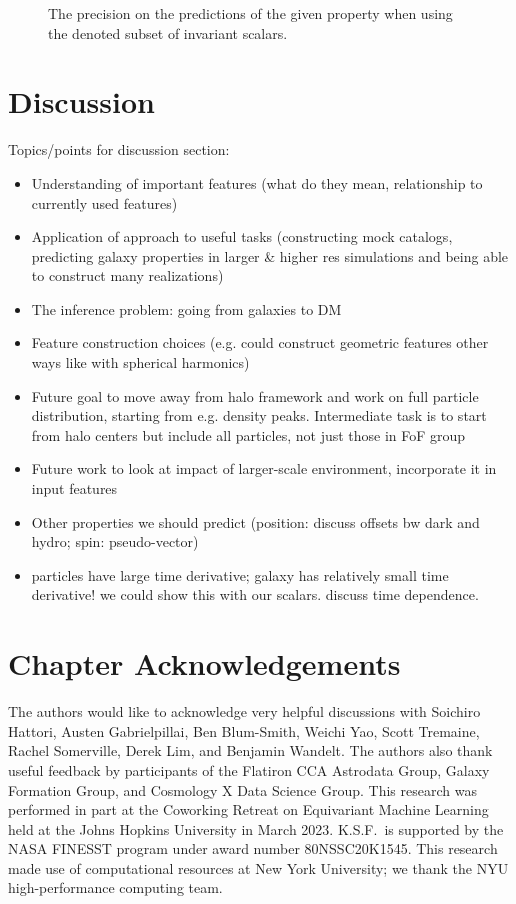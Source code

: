 \begin{figure}
    \centering
    \caption{The precision on the predictions of the given property when using the denoted subset of invariant scalars.}
    \label{fig:features}
\end{figure}


\section{Discussion}
\label{sec:discussion}

Topics/points for discussion section:
\begin{itemize}
    \item Understanding of important features (what do they mean, relationship to currently used features)
    \item Application of approach to useful tasks (constructing mock catalogs, predicting galaxy properties in larger \& higher res simulations and being able to construct many realizations)
    \item The inference problem: going from galaxies to DM
    \item Feature construction choices (e.g. could construct geometric features other ways like with spherical harmonics)
    \item Future goal to move away from halo framework and work on full particle distribution, starting from e.g. density peaks. Intermediate task is to start from halo centers but include all particles, not just those in FoF group
    \item Future work to look at impact of larger-scale environment, incorporate it in input features
    \item Other properties we should predict (position: discuss offsets bw dark and hydro; spin: pseudo-vector)
    \item particles have large time derivative; galaxy has relatively small time derivative! we could show this with our scalars. discuss time dependence.
\end{itemize}


\section{Chapter Acknowledgements}
The authors would like to acknowledge very helpful discussions with Soichiro Hattori, Austen Gabrielpillai, Ben Blum-Smith, Weichi Yao, Scott Tremaine, Rachel Somerville, Derek Lim, and Benjamin Wandelt.
The authors also thank useful feedback by participants of the Flatiron CCA Astrodata Group, Galaxy Formation Group, and Cosmology X Data Science Group.
This research was performed in part at the Coworking Retreat on Equivariant Machine Learning held at the Johns Hopkins University in March 2023.
K.S.F.~is supported by the NASA FINESST program under award number 80NSSC20K1545.
This research made use of computational resources at New York University; we thank the NYU high-performance computing team.